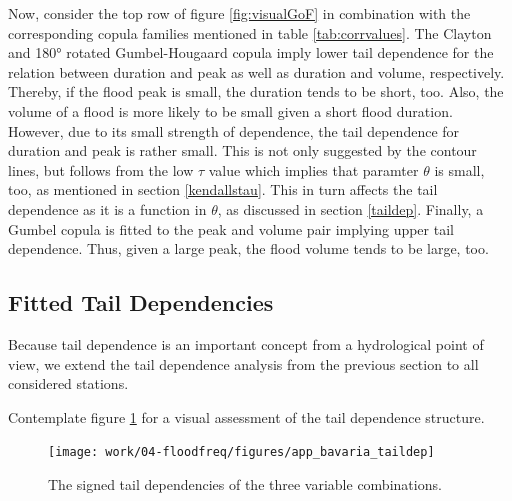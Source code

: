 \documentclass[
]{krantz}
\begin{document}
Now, consider the top row of figure \ref{fig:visualGoF} in combination with the corresponding copula families
mentioned in table \ref{tab:corrvalues}. The Clayton and 180° rotated Gumbel-Hougaard copula imply
lower tail dependence for the relation between duration and peak as well as duration and volume, respectively.
Thereby, if the flood peak is small, the duration tends to be short, too. Also, the volume of a flood
is more likely to be small
given a short flood duration.
However, due to its small strength of dependence, the tail dependence for duration and peak is rather small.
This is not only suggested by the contour lines,
but follows from the low \(\tau\) value which implies that paramter \(\theta\) is small, too, as mentioned in
section \ref{kendallstau}.
This in turn affects the tail dependence as it is a function in \(\theta\), as discussed in section \ref{taildep}.
Finally, a Gumbel copula is fitted to the peak and volume pair implying upper tail
dependence. Thus, given a large peak, the flood volume tends to be large, too.

\subsection{Fitted Tail Dependencies}\label{fitted-tail-dependencies}

Because tail dependence is an important concept from a hydrological point of view,
we extend the tail dependence analysis from the previous section to all considered stations.

Contemplate figure \ref{fig:bavariaTaildep} for a visual assessment of the tail dependence structure.

\begin{figure}

{\centering \texttt{[image: work/04-floodfreq/figures/app\_bavaria\_taildep]} 

}

\caption{The signed tail dependencies of the three variable combinations.}\label{fig:bavariaTaildep}
\end{figure}
\end{document}
